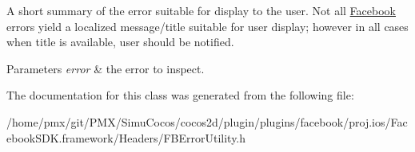 A short summary of the error suitable for display to the user. Not all \hyperlink{interfaceFacebook}{Facebook} errors yield a localized message/title suitable for user display; however in all cases when title is available, user should be notified.


\begin{DoxyParams}{Parameters}
{\em error} & the error to inspect. \\
\hline
\end{DoxyParams}


The documentation for this class was generated from the following file\+:\begin{DoxyCompactItemize}
\item 
/home/pmx/git/\+P\+M\+X/\+Simu\+Cocos/cocos2d/plugin/plugins/facebook/proj.\+ios/\+Facebook\+S\+D\+K.\+framework/\+Headers/F\+B\+Error\+Utility.\+h\end{DoxyCompactItemize}
